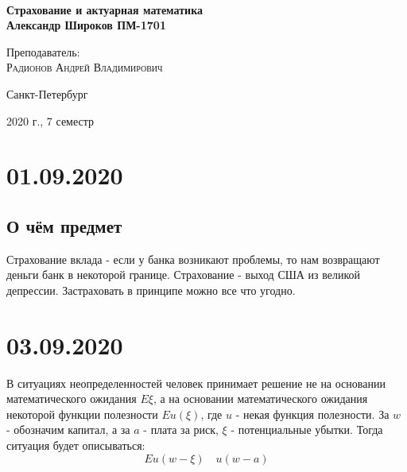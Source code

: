 \documentclass[aps,%
12pt,%
final,%
oneside,
onecolumn,%
musixtex, %
superscriptaddress,%
centertags]{article} %
\theoremstyle{plain}
\theoremstyle{definition}
\theoremstyle{remark}
\begin{document}
\begin{titlepage} 
\begin{center}
\textbf{}\\[10.0cm]
\textbf{\LARGE Страхование и актуарная математика}\\[0.5cm]
\textbf{\Large Александр Широков ПМ-1701} \\[0.2cm]


\begin{center} \large
{Преподаватель:} \\[0.5cm]
\textsc {Радионов Андрей Владимирович}\\
\end{center}

\vfill 



{\large {Санкт-Петербург}} \par
{\large {2020 г., 7 семестр}}
\end{center} 
\end{titlepage}

\begin{thebibliography}{3}
\end{thebibliography}
\tableofcontents
\newpage

\section{01.09.2020}

\subsection{О чём предмет}

Страхование вклада - если у банка возникают проблемы, то нам возвращают деньги банк в некоторой границе. Страхование - выход США из великой депрессии. Застраховать в принципе можно все что угодно.

\section{03.09.2020}

В ситуациях неопределенностей человек принимает решение не на основании математического ожидания $E\xi$, а на основании математического ожидания некоторой функции полезности $Eu(\xi)$, где $u$ - некая функция полезности. За $w$ - обозначим капитал, а за $a$ - плата за риск, $\xi$ - потенциальные убытки. Тогда ситуация будет описываться:
$$Eu(w-\xi) \quad u(w-a)$$
\end{document}
